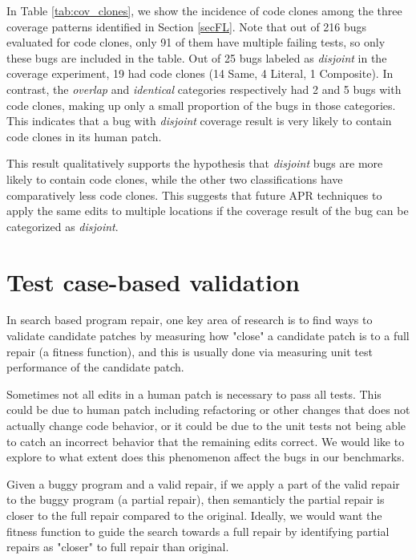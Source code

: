 \documentclass[sigconf, timestamp-false, anonymous=true]{acmart}
\begin{document}
In Table \ref{tab:cov_clones}, we show the incidence of code clones among the three 
coverage patterns identified in Section \ref{secFL}. Note that out of 216 bugs evaluated for code clones, only 91 of them have multiple failing tests, so only these bugs are included in the table.  Out of 25 bugs labeled as 
\emph{disjoint} in the coverage 
experiment, 19 had code clones (14 Same, 4 Literal, 1 Composite). In contrast, the 
\emph{overlap} and \emph{identical} categories respectively had 2 and 5 bugs with code clones, 
making up only a small proportion of the bugs in those categories. This indicates that a 
bug with \emph{disjoint} coverage result is very likely to contain code clones in its
human patch. 

This result qualitatively supports the hypothesis that \emph{disjoint} bugs are more likely to contain 
code clones, while the other two classifications have comparatively less code clones. This suggests that 
future APR techniques to apply the same edits to multiple locations
if the coverage result of the bug can be categorized as \emph{disjoint}.


\section{Test case-based validation}

In search based program repair, one key area of research is to find ways to validate
candidate patches by
measuring how "close" a candidate patch is to a full repair (a fitness function),
and this is usually done via measuring unit test performance of the candidate patch. 


Sometimes not all edits in a human patch is necessary to pass all tests. This could be
due to human patch including refactoring or other changes that does not actually
change code behavior, or it could be due to the unit tests not being able to catch
an incorrect behavior that the remaining edits correct. We would like to explore
to what extent does this phenomenon affect the bugs in our benchmarks.


Given a buggy program and a valid repair, if we apply a part of the valid repair to 
the buggy program (a partial repair), then semanticly the partial repair is closer
 to the full repair compared to the original. 
Ideally, we would want the fitness function to guide the search towards a full 
repair by identifying partial repairs as "closer" to full repair than original.
\end{document}
